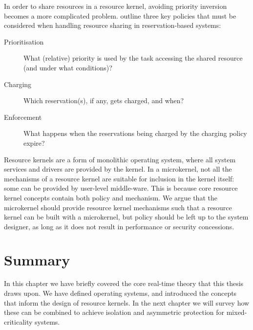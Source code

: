 In order to share resources in a resource kernel, avoiding priority inversion becomes a more
complicated problem.  \citet{deNiz_LSR_01} outline three key policies that must be considered when
handling resource sharing in reservation-based systems:

\begin{description}
    \item[Prioritisation] What (relative) priority is used by the task accessing the shared resource (and under what conditions)?
    \item[Charging] Which reservation(s), if any, gets charged, and when?
    \item[Enforcement] What happens when the reservations being charged by the charging policy expire?
\end{description}

Resource kernels are a form of monolithic operating system, where all system services and drivers
are provided by the kernel.  In a microkernel, not all the mechanisms of a resource kernel are
suitable for inclusion in the kernel itself: some can be provided by user-level middle-ware.  This
is because core resource kernel concepts contain both policy and mechanism.  We argue that the
microkernel should provide resource kernel mechanisms such that a resource kernel can be built with
a microkernel, but policy should be left up to the system designer, as long as it does not result in
performance or security concessions.

\section{Summary}

In this chapter we have briefly covered the core real-time theory that this thesis draws upon.
We have defined operating systems, and introduced the concepts that inform the design of resource kernels.
In the next chapter we will survey how these can be combined to achieve isolation and asymmetric protection for mixed-criticality systems.
